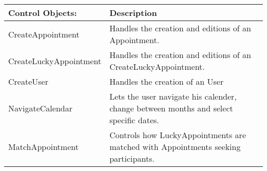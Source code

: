 {\tabulinesep=1.2mm
\begin{tabu}{ | p{6cm} | p{10cm} |}
    \hline
\textbf{Control Objects:} 	& 		\textbf{Description} \\ \hline
    CreateAppointment       &       Handles the creation and editions of an Appointment.\\\hline
    CreateLuckyAppointment  &       Handles the creation and editions of an CreateLuckyAppointment.\\\hline
    CreateUser              &       Handles the creation of an User\\\hline
    NavigateCalendar        &       Lets the user navigate his calender, change between months and select specific dates.\\\hline
    MatchAppointment 	    & 		Controls how LuckyAppointments are matched with Appointments seeking participants.\\ \hline
\end{tabu}
}